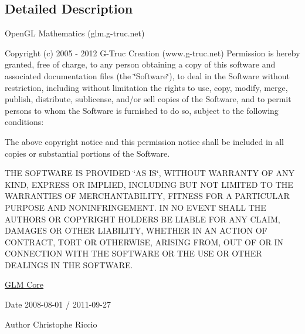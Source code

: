 \subsection{\-Detailed \-Description}
\-Open\-G\-L \-Mathematics (glm.\-g-\/truc.\-net)

\-Copyright (c) 2005 -\/ 2012 \-G-\/\-Truc \-Creation (www.\-g-\/truc.\-net) \-Permission is hereby granted, free of charge, to any person obtaining a copy of this software and associated documentation files (the \char`\"{}\-Software\char`\"{}), to deal in the \-Software without restriction, including without limitation the rights to use, copy, modify, merge, publish, distribute, sublicense, and/or sell copies of the \-Software, and to permit persons to whom the \-Software is furnished to do so, subject to the following conditions\-:

\-The above copyright notice and this permission notice shall be included in all copies or substantial portions of the \-Software.

\-T\-H\-E \-S\-O\-F\-T\-W\-A\-R\-E \-I\-S \-P\-R\-O\-V\-I\-D\-E\-D \char`\"{}\-A\-S I\-S\char`\"{}, \-W\-I\-T\-H\-O\-U\-T \-W\-A\-R\-R\-A\-N\-T\-Y \-O\-F \-A\-N\-Y \-K\-I\-N\-D, \-E\-X\-P\-R\-E\-S\-S \-O\-R \-I\-M\-P\-L\-I\-E\-D, \-I\-N\-C\-L\-U\-D\-I\-N\-G \-B\-U\-T \-N\-O\-T \-L\-I\-M\-I\-T\-E\-D \-T\-O \-T\-H\-E \-W\-A\-R\-R\-A\-N\-T\-I\-E\-S \-O\-F \-M\-E\-R\-C\-H\-A\-N\-T\-A\-B\-I\-L\-I\-T\-Y, \-F\-I\-T\-N\-E\-S\-S \-F\-O\-R \-A \-P\-A\-R\-T\-I\-C\-U\-L\-A\-R \-P\-U\-R\-P\-O\-S\-E \-A\-N\-D \-N\-O\-N\-I\-N\-F\-R\-I\-N\-G\-E\-M\-E\-N\-T. \-I\-N \-N\-O \-E\-V\-E\-N\-T \-S\-H\-A\-L\-L \-T\-H\-E \-A\-U\-T\-H\-O\-R\-S \-O\-R \-C\-O\-P\-Y\-R\-I\-G\-H\-T \-H\-O\-L\-D\-E\-R\-S \-B\-E \-L\-I\-A\-B\-L\-E \-F\-O\-R \-A\-N\-Y \-C\-L\-A\-I\-M, \-D\-A\-M\-A\-G\-E\-S \-O\-R \-O\-T\-H\-E\-R \-L\-I\-A\-B\-I\-L\-I\-T\-Y, \-W\-H\-E\-T\-H\-E\-R \-I\-N \-A\-N \-A\-C\-T\-I\-O\-N \-O\-F \-C\-O\-N\-T\-R\-A\-C\-T, \-T\-O\-R\-T \-O\-R \-O\-T\-H\-E\-R\-W\-I\-S\-E, \-A\-R\-I\-S\-I\-N\-G \-F\-R\-O\-M, \-O\-U\-T \-O\-F \-O\-R \-I\-N \-C\-O\-N\-N\-E\-C\-T\-I\-O\-N \-W\-I\-T\-H \-T\-H\-E \-S\-O\-F\-T\-W\-A\-R\-E \-O\-R \-T\-H\-E \-U\-S\-E \-O\-R \-O\-T\-H\-E\-R \-D\-E\-A\-L\-I\-N\-G\-S \-I\-N \-T\-H\-E \-S\-O\-F\-T\-W\-A\-R\-E.

\hyperlink{group__core}{\-G\-L\-M \-Core}

\begin{DoxyDate}{\-Date}
2008-\/08-\/01 / 2011-\/09-\/27 
\end{DoxyDate}
\begin{DoxyAuthor}{\-Author}
\-Christophe \-Riccio 
\end{DoxyAuthor}
